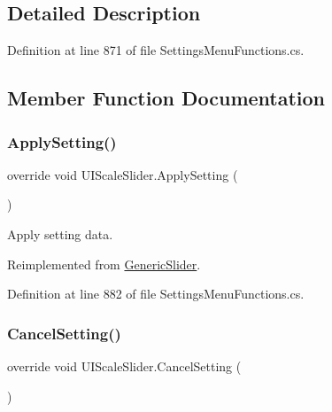 \subsection{Detailed Description}


Definition at line 871 of file Settings\+Menu\+Functions.\+cs.



\subsection{Member Function Documentation}
\mbox{\label{class_u_i_scale_slider_a71d07c681d338c8966be167f0a7aa4d0}} 
\subsubsection{\texorpdfstring{Apply\+Setting()}{ApplySetting()}}
{\footnotesize\ttfamily override void U\+I\+Scale\+Slider.\+Apply\+Setting (\begin{DoxyParamCaption}{ }\end{DoxyParamCaption})\hspace{0.3cm}{\ttfamily [virtual]}}



Apply setting data. 



Reimplemented from \hyperlink{class_generic_slider_ae98915fdb0f94d37222e83e93f6ac814}{Generic\+Slider}.



Definition at line 882 of file Settings\+Menu\+Functions.\+cs.

\mbox{\label{class_u_i_scale_slider_ad9ee67106d15b871f0f9920d18747296}} 
\subsubsection{\texorpdfstring{Cancel\+Setting()}{CancelSetting()}}
{\footnotesize\ttfamily override void U\+I\+Scale\+Slider.\+Cancel\+Setting (\begin{DoxyParamCaption}{ }\end{DoxyParamCaption})\hspace{0.3cm}{\ttfamily [virtual]}}



